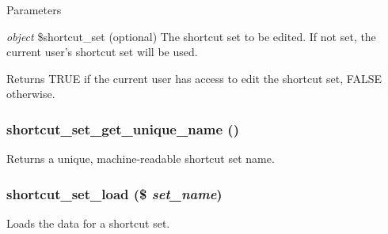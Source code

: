 \begin{DoxyParams}{Parameters}
\item[{\em object}]\$shortcut\_\-set (optional) The shortcut set to be edited. If not set, the current user's shortcut set will be used.\end{DoxyParams}
\begin{DoxyReturn}{Returns}
TRUE if the current user has access to edit the shortcut set, FALSE otherwise. 
\end{DoxyReturn}
\hypertarget{shortcut_8module_a1765cac37f39a6c3dd8ebb81c0084f8c}{
\subsubsection[{shortcut\_\-set\_\-get\_\-unique\_\-name}]{\setlength{\rightskip}{0pt plus 5cm}shortcut\_\-set\_\-get\_\-unique\_\-name ()}}
\label{shortcut_8module_a1765cac37f39a6c3dd8ebb81c0084f8c}
Returns a unique, machine-\/readable shortcut set name. \hypertarget{shortcut_8module_a66161b6ac12978c1a31bb5c5bf27dc65}{
\subsubsection[{shortcut\_\-set\_\-load}]{\setlength{\rightskip}{0pt plus 5cm}shortcut\_\-set\_\-load (\$ {\em set\_\-name})}}
\label{shortcut_8module_a66161b6ac12978c1a31bb5c5bf27dc65}
Loads the data for a shortcut set.


